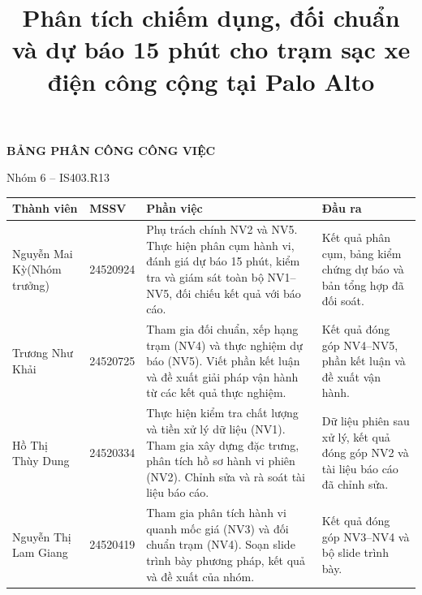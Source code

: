 \documentclass[conference,a4paper]{IEEEtran}
\newcommand{\reporttitle}{Phân tích chiếm dụng, đối chuẩn và dự báo 15 phút cho trạm sạc xe điện công cộng tại Palo Alto}
\begin{document}
\clearpage
\thispagestyle{empty}
\begin{center}
{\Large\bfseries BẢNG PHÂN CÔNG CÔNG VIỆC\par}
\vspace{0.3cm}
{\large Nhóm 6 -- IS403.R13\par}
\end{center}
\vspace{0.55cm}
{\normalsize
\renewcommand{\arraystretch}{1.38}
\begin{tabularx}{\textwidth}{@{}p{}p{}Xp{}@{}}
\toprule
\textbf{Thành viên} & \textbf{MSSV} & \textbf{Phần việc} & \textbf{Đầu ra} \\
\midrule
Nguyễn Mai Kỳ\newline (Nhóm trưởng) & 24520924 &
Phụ trách chính NV2 và NV5. Thực hiện phân cụm hành vi, đánh giá dự báo 15 phút, kiểm tra và giám sát toàn bộ NV1--NV5, đối chiếu kết quả với báo cáo. &
Kết quả phân cụm, bảng kiểm chứng dự báo và bản tổng hợp đã đối soát. \\
\addlinespace[5pt]
Trương Như Khải & 24520725 &
Tham gia đối chuẩn, xếp hạng trạm (NV4) và thực nghiệm dự báo (NV5). Viết phần kết luận và đề xuất giải pháp vận hành từ các kết quả thực nghiệm. &
Kết quả đóng góp NV4--NV5, phần kết luận và đề xuất vận hành. \\
\addlinespace[5pt]
Hồ Thị Thùy Dung & 24520334 &
Thực hiện kiểm tra chất lượng và tiền xử lý dữ liệu (NV1). Tham gia xây dựng đặc trưng, phân tích hồ sơ hành vi phiên (NV2). Chỉnh sửa và rà soát tài liệu báo cáo. &
Dữ liệu phiên sau xử lý, kết quả đóng góp NV2 và tài liệu báo cáo đã chỉnh sửa. \\
\addlinespace[5pt]
Nguyễn Thị Lam Giang & 24520419 &
Tham gia phân tích hành vi quanh mốc giá (NV3) và đối chuẩn trạm (NV4). Soạn slide trình bày phương pháp, kết quả và đề xuất của nhóm. &
Kết quả đóng góp NV3--NV4 và bộ slide trình bày. \\
\bottomrule
\end{tabularx}\par}

\clearpage
\twocolumn
\setcounter{page}{1}
\title{\reporttitle}
\author{
}
\maketitle
\end{document}

